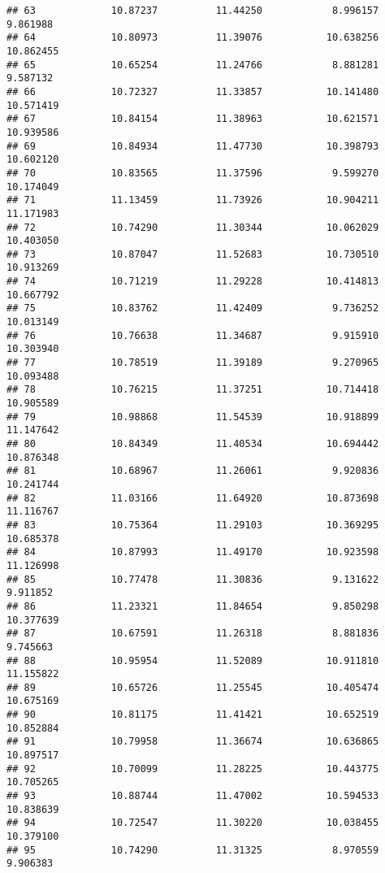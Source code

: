 \documentclass[
]{article}
\begin{document}
\begin{verbatim}
## 63             10.87237          11.44250            8.996157          9.861988
## 64             10.80973          11.39076           10.638256         10.862455
## 65             10.65254          11.24766            8.881281          9.587132
## 66             10.72327          11.33857           10.141480         10.571419
## 67             10.84154          11.38963           10.621571         10.939586
## 69             10.84934          11.47730           10.398793         10.602120
## 70             10.83565          11.37596            9.599270         10.174049
## 71             11.13459          11.73926           10.904211         11.171983
## 72             10.74290          11.30344           10.062029         10.403050
## 73             10.87047          11.52683           10.730510         10.913269
## 74             10.71219          11.29228           10.414813         10.667792
## 75             10.83762          11.42409            9.736252         10.013149
## 76             10.76638          11.34687            9.915910         10.303940
## 77             10.78519          11.39189            9.270965         10.093488
## 78             10.76215          11.37251           10.714418         10.905589
## 79             10.98868          11.54539           10.918899         11.147642
## 80             10.84349          11.40534           10.694442         10.876348
## 81             10.68967          11.26061            9.920836         10.241744
## 82             11.03166          11.64920           10.873698         11.116767
## 83             10.75364          11.29103           10.369295         10.685378
## 84             10.87993          11.49170           10.923598         11.126998
## 85             10.77478          11.30836            9.131622          9.911852
## 86             11.23321          11.84654            9.850298         10.377639
## 87             10.67591          11.26318            8.881836          9.745663
## 88             10.95954          11.52089           10.911810         11.155822
## 89             10.65726          11.25545           10.405474         10.675169
## 90             10.81175          11.41421           10.652519         10.852884
## 91             10.79958          11.36674           10.636865         10.897517
## 92             10.70099          11.28225           10.443775         10.705265
## 93             10.88744          11.47002           10.594533         10.838639
## 94             10.72547          11.30220           10.038455         10.379100
## 95             10.74290          11.31325            8.970559          9.906383

\end{verbatim}
\end{document}
